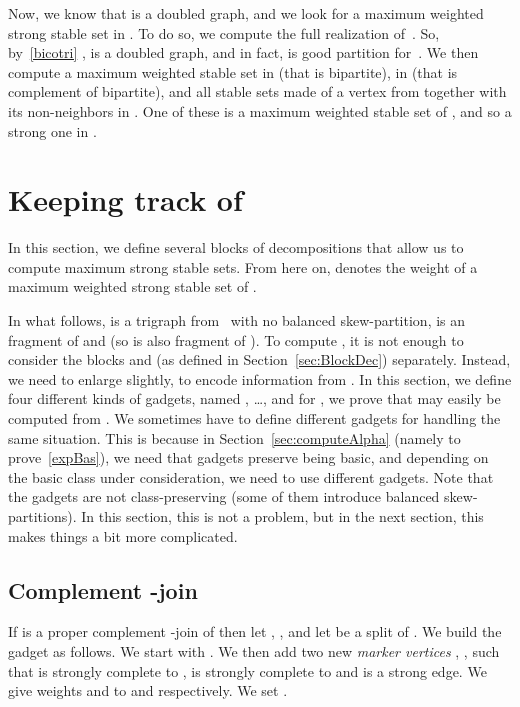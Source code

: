 \documentclass[11 pt] {article}
\newcommand\blackslug{\hbox{\hskip 1pt \vrule width 4pt height 8pt depth 1.5pt
        \hskip 1pt}}
\newcommand\bbox{\hfill \quad \blackslug \medbreak}
\begin{document}
Now, we know that  is a doubled graph, and we look for a maximum
weighted strong stable set in .  To do so, we compute the full
realization  of~.  So, by~\ref{bicotri} ,  is a doubled graph,
and in fact,  is good partition for~.  We then compute a
maximum weighted stable set in  (that is bipartite), in 
(that is complement of bipartite), and all stable sets made of a
vertex from  together with its non-neighbors in .  One of these
is a maximum weighted stable set of , and so a strong one in .
\bbox

\section{Keeping track of }
\label{sec:decAlpha}

In this section, we define several blocks of decompositions that allow
us to compute maximum strong stable sets.  From here on, 
denotes the weight of a maximum weighted strong stable set of .

In what follows,  is a trigraph from~ with no balanced
skew-partition,  is an fragment of  and  (so
 is also fragment of ).  To compute , it is not enough to
consider the blocks  and  (as defined in
Section~\ref{sec:BlockDec}) separately.  Instead, we need to enlarge
 slightly, to encode information from . In this section, we define four different kinds
of gadgets, named , \dots,  and for , we prove that  may easily be computed from
.  We sometimes have to define different gadgets for
handling the same situation.  This is because in
Section~\ref{sec:computeAlpha} (namely to prove~\ref{expBas}), we need
that gadgets preserve being basic, and depending on the basic class
under consideration, we need to use different gadgets.  Note that the
gadgets are not class-preserving (some of them introduce balanced
skew-partitions).  In this section, this is not a problem, but in the
next section, this makes things a bit more complicated.



\subsection{Complement -join}
\label{ss:c2j}

If  is a proper complement -join of  then let ,
, and let  be a split of .  We build the gadget  as follows.  We
start with . We then add two new \emph{marker vertices} ,
, such that  is strongly complete to ,  is
strongly complete to  and  is a strong edge.  We give
weights  and  to
 and  respectively.  We set .
\end{document}
